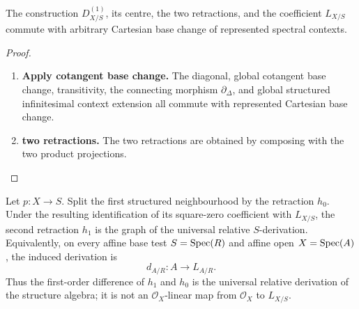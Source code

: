 \begin{proposition}
\label{prop:first-diagonal-base-change}
The construction \(D^{(1)}_{X/S}\), its centre, the two retractions, and the
coefficient \(L_{X/S}\) commute with arbitrary Cartesian base change of
represented spectral contexts.
\end{proposition}

\begin{proof}
\leavevmode
\begin{enumerate}[label=\textup{(\arabic*)}]
    \item \textbf{Apply cotangent base change.}
    The diagonal, global cotangent base change, transitivity, the connecting morphism
    \(\partial_\Delta\), and global structured infinitesimal context extension all commute with
    represented Cartesian base change.

    \item \textbf{two retractions.}
    The two retractions are obtained by composing with the two product projections.
\end{enumerate}
\end{proof}

\begin{theorem}
\label{thm:first-neighbourhood-universal-derivation}
Let \(p:X\to S\). Split the first structured neighbourhood by the retraction
\(h_0\). Under the resulting identification of its square-zero coefficient
with \(L_{X/S}\), the second retraction \(h_1\) is the graph of the universal
relative \(S\)-derivation. Equivalently, on every affine base test
\(S=\operatorname{Spec}(R)\) and affine open \(X=\operatorname{Spec}(A)\), the induced derivation is
\[
    d_{A/R}:A\longrightarrow L_{A/R}.
\]
Thus the first-order difference of \(h_1\) and \(h_0\) is the universal
relative derivation of the structure algebra; it is not an
\(\mathcal O_X\)-linear map from \(\mathcal O_X\) to \(L_{X/S}\).
\end{theorem}

